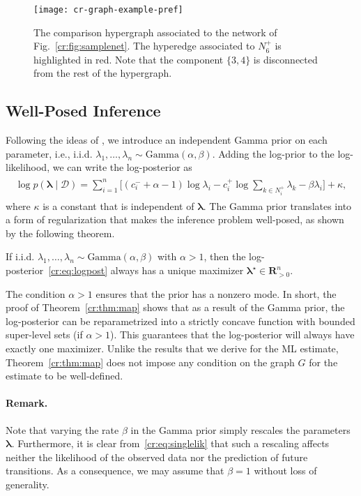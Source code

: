 \begin{figure}[t]
  \centering
  \texttt{[image: cr-graph-example-pref]}
  \caption{The comparison hypergraph associated to the network of Fig.~\ref{cr:fig:samplenet}.
The hyperedge associated to $N^+_6$ is highlighted in red.
Note that the component $\{3, 4\}$ is disconnected from the rest of the hypergraph.}
  \label{cr:fig:samplehyp}
\end{figure}


\subsection{Well-Posed Inference}

Following the ideas of \citet{caron2012efficient}, we introduce an independent Gamma prior on each parameter, i.e., i.i.d. $\lambda_1, \ldots, \lambda_n \sim \text{Gamma}(\alpha, \beta)$.
Adding the log-prior to the log-likelihood, we can write the log-posterior as
\begin{align}
\begin{aligned}
\label{cr:eq:logpost}
\log p(\bm{\lambda} \mid \mathcal{D}) = \sum_{i = 1}^n
  \bigg[ (c^-_i + \alpha - 1) \log \lambda_i
        - c^+_i \log\!\sum_{k \in N^+_i}\!\lambda_k  - \beta \lambda_i \bigg] + \kappa,
\end{aligned}
\end{align}
where $\kappa$ is a constant that is independent of $\bm{\lambda}$.
The Gamma prior translates into a form of regularization that makes the inference problem well-posed, as shown by the following theorem.

\begin{theorem}
\label{cr:thm:map}
If i.i.d. $\lambda_1, \ldots, \lambda_n \sim \text{Gamma}(\alpha, \beta)$ with $\alpha > 1$, then the log-posterior~\eqref{cr:eq:logpost} always has a unique maximizer $\bm{\lambda}^\star \in \mathbf{R}^n_{>0}$.
\end{theorem}

The condition $\alpha > 1$ ensures that the prior has a nonzero mode.
In short, the proof of Theorem~\ref{cr:thm:map} shows that as a result of the Gamma prior, the log-posterior can be reparametrized into a strictly concave function with bounded super-level sets (if $\alpha > 1$).
This guarantees that the log-posterior will always have exactly one maximizer.
Unlike the results that we derive for the ML estimate, Theorem~\ref{cr:thm:map} does not impose any condition on the graph $G$ for the estimate to be well-defined.

\paragraph{Remark.}
Note that varying the rate $\beta$ in the Gamma prior simply rescales the parameters $\bm{\lambda}$.
Furthermore, it is clear from~\eqref{cr:eq:singlelik} that such a rescaling affects neither the likelihood of the observed data nor the prediction of future transitions.
As a consequence, we may assume that $\beta = 1$ without loss of generality.
